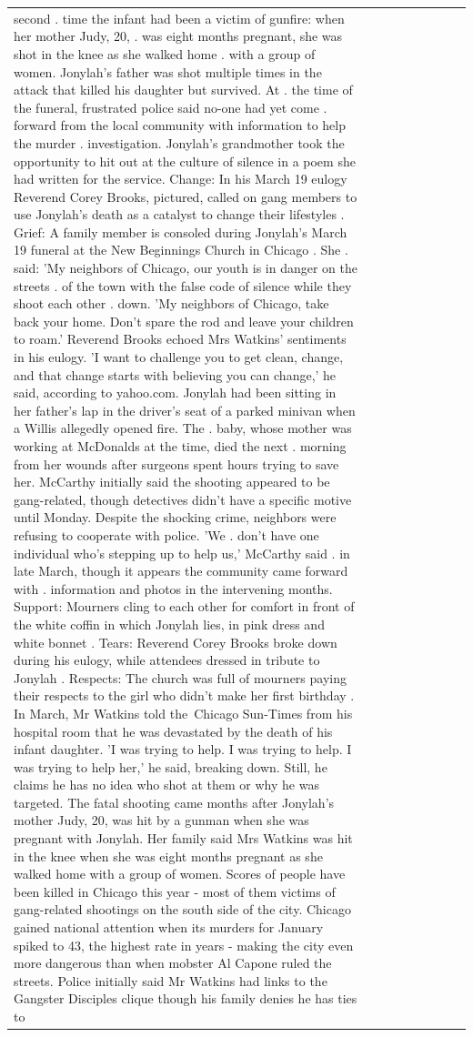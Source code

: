\begin{table}[H]
\begin{tabular}{lllrlllll}
second . time the infant had been a victim of gunfire: when her mother Judy, 20, . was eight months pregnant, she was shot in the knee as she walked home . with a group of women. Jonylah's father was shot multiple times in the attack that killed his daughter but survived. At . the time of the funeral, frustrated police said no-one had yet come . forward from the local community with information to help the murder . investigation. Jonylah's grandmother took the opportunity to hit out at the culture of silence in a poem she had written for the service. Change: In his March 19 eulogy Reverend Corey Brooks, pictured, called on gang members to use Jonylah's death as a catalyst to change their lifestyles . Grief: A family member is consoled during Jonylah's March 19 funeral at the New Beginnings Church in Chicago . She . said: 'My neighbors of Chicago, our youth is in danger on the streets . of the town with the false code of silence while they shoot each other . down. 'My neighbors of Chicago, take back your home. Don't spare the rod and leave your children to roam.' Reverend Brooks echoed Mrs Watkins' sentiments in his eulogy. 'I want to challenge you to get clean, change, and that change starts with believing you can change,' he said, according to yahoo.com. Jonylah had been sitting in her father's lap in the driver's seat of a parked minivan when a Willis allegedly opened fire. The . baby, whose mother was working at McDonalds at the time, died the next . morning from her wounds after surgeons spent hours trying to save her. McCarthy initially said the shooting appeared to be gang-related, though detectives didn't have a specific motive until Monday. Despite the shocking crime, neighbors were refusing to cooperate with police. 'We . don't have one individual who's stepping up to help us,' McCarthy said . in late March, though it appears the community came forward with . information and photos in the intervening months. Support: Mourners cling to each other for comfort in front of the white coffin in which Jonylah lies, in pink dress and white bonnet . Tears: Reverend Corey Brooks broke down during his eulogy, while attendees dressed in tribute to Jonylah . Respects: The church was full of mourners paying their respects to the girl who didn't make her first birthday . In March, Mr Watkins told the Chicago Sun-Times from his hospital room that he was devastated by the death of his infant daughter. 'I was trying to help. I was trying to help. I was trying to help her,' he said, breaking down. Still, he claims he has no idea who shot at them or why he was targeted. The fatal shooting came months after Jonylah's mother Judy, 20, was hit by a gunman when she was pregnant with Jonylah. Her family said Mrs Watkins was hit in the knee when she was eight months pregnant as she walked home with a group of women. Scores of people have been killed in Chicago this year - most of them victims of gang-related shootings on the south side of the city. Chicago gained national attention when its murders for January spiked to 43, the highest rate in years - making the city even more dangerous than when mobster Al Capone ruled the streets. Police initially said Mr Watkins had links to the Gangster Disciples clique though his family denies he has ties to 
\end{tabular}
\end{table}
